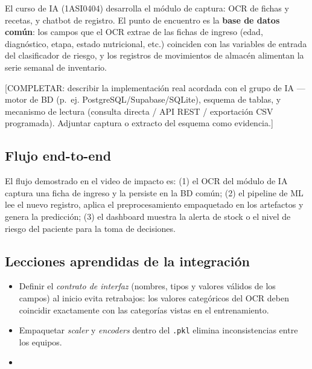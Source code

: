 El curso de IA (1ASI0404) desarrolla el módulo de captura: OCR de fichas y
recetas, y chatbot de registro. El punto de encuentro es la \textbf{base de
datos común}: los campos que el OCR extrae de las fichas de ingreso
(edad, diagnóstico, etapa, estado nutricional, etc.) coinciden con las
variables de entrada del clasificador de riesgo, y los registros de
movimientos de almacén alimentan la serie semanal de inventario.

[COMPLETAR: describir la implementación real acordada con el grupo de IA ---
motor de BD (p.~ej. PostgreSQL/Supabase/SQLite), esquema de tablas, y
mecanismo de lectura (consulta directa / API REST / exportación CSV
programada). Adjuntar captura o extracto del esquema como evidencia.]

\subsection{Flujo end-to-end}

El flujo demostrado en el video de impacto es: (1) el OCR del módulo de IA
captura una ficha de ingreso y la persiste en la BD común; (2) el pipeline
de ML lee el nuevo registro, aplica el preprocesamiento empaquetado en los
artefactos y genera la predicción; (3) el dashboard muestra la alerta de
stock o el nivel de riesgo del paciente para la toma de decisiones.

\subsection{Lecciones aprendidas de la integración}

\begin{itemize}[leftmargin=1.6em]
  \item Definir el \emph{contrato de interfaz} (nombres, tipos y valores
        v\'alidos de los campos) al inicio evita retrabajos: los valores
        categ\'oricos del OCR deben coincidir exactamente con las categor\'ias
        vistas en el entrenamiento.
  \item Empaquetar \emph{scaler} y \emph{encoders} dentro del \texttt{.pkl}
        elimina inconsistencias entre los equipos.
  \item [COMPLETAR: 1--2 lecciones específicas del trabajo real con el
        grupo de IA.]
\end{itemize}

